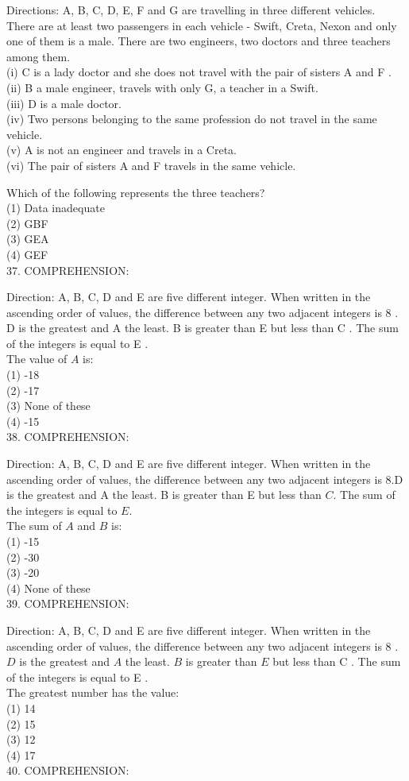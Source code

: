 \documentclass[10pt]{article}
\begin{document}
Directions: A, B, C, D, E, F and G are travelling in three different vehicles. There are at least two passengers in each vehicle - Swift, Creta, Nexon and only one of them is a male. There are two engineers, two doctors and three teachers among them.\\
(i) C is a lady doctor and she does not travel with the pair of sisters A and F .\\
(ii) B a male engineer, travels with only G, a teacher in a Swift.\\
(iii) D is a male doctor.\\
(iv) Two persons belonging to the same profession do not travel in the same vehicle.\\
(v) A is not an engineer and travels in a Creta.\\
(vi) The pair of sisters A and F travels in the same vehicle.

Which of the following represents the three teachers?\\
(1) Data inadequate\\
(2) GBF\\
(3) GEA\\
(4) GEF\\
37. COMPREHENSION:

Direction: A, B, C, D and E are five different integer. When written in the ascending order of values, the difference between any two adjacent integers is 8 . D is the greatest and A the least. B is greater than E but less than C . The sum of the integers is equal to E .\\
The value of $A$ is:\\
(1) -18\\
(2) -17\\
(3) None of these\\
(4) -15\\
38. COMPREHENSION:

Direction: A, B, C, D and E are five different integer. When written in the ascending order of values, the difference between any two adjacent integers is $8 . \mathrm{D}$ is the greatest and A the least. B is greater than E but less than $C$. The sum of the integers is equal to $E$.\\
The sum of $A$ and $B$ is:\\
(1) -15\\
(2) -30\\
(3) -20\\
(4) None of these\\
39. COMPREHENSION:

Direction: A, B, C, D and E are five different integer. When written in the ascending order of values, the difference between any two adjacent integers is 8 . $D$ is the greatest and $A$ the least. $B$ is greater than $E$ but less than C . The sum of the integers is equal to E .\\
The greatest number has the value:\\
(1) 14\\
(2) 15\\
(3) 12\\
(4) 17\\
40. COMPREHENSION:
\end{document}
